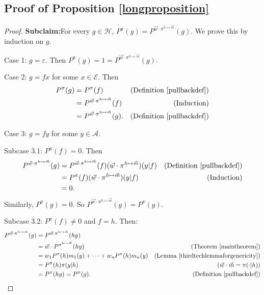 \documentclass[twoside]{article}
\begin{document}
\subsection{Proof of Proposition \ref{longproposition}}
\begin{proof}
    \textbf{Subclaim:}For every $g\in\mathcal H$,
    $P^\pi(g)=P^{\vec w\cdot\pi^{h\mapsto \vec m}}(g)$.
    We prove this by induction on $g$.

    Case 1: $g=\varepsilon$.
    Then $P^\pi(g)=1
    =P^{\vec w\cdot\pi^{h\mapsto \vec m}}(g)$.

    Case 2: $g=fx$ for some $x\in\mathcal E$.
    Then
    \begin{align*}
        P^\pi(g)
            &= P^\pi(f)
                &\mbox{(Definition \ref{pullbackdef})}\\
            &= P^{\vec w\cdot\pi^{h\mapsto \vec m}}(f)
                &\mbox{(Induction)}\\
            &= P^{\vec w\cdot\pi^{h\mapsto \vec m}}(g).
                &\mbox{(Definition \ref{pullbackdef})}
    \end{align*}

    Case 3: $g=fy$ for some $y\in\mathcal A$.

    Subcase 3.1: $P^\pi(f)=0$.
    Then
    \begin{align*}
        P^{\vec w\cdot\pi^{h\mapsto \vec m}}(g)
            &= P^{\vec w\cdot\pi^{h\mapsto \vec m}}(f)
            (\vec w\cdot\pi^{h\mapsto \vec m})(y|f)
                &\mbox{(Definition \ref{pullbackdef})}\\
            &= P^\pi(f)(\vec w\cdot\pi^{h\mapsto \vec m})(y|f)
                &\mbox{(Induction)}\\
            &= 0.
    \end{align*}
    Similarly, $P^\pi(g)=0$. So $P^{\vec w\cdot\pi^{h\mapsto \vec m}}(g)=P^\pi(g)$.

    Subcase 3.2: $P^\pi(f)\not=0$ and $f=h$. Then:
    \begin{align*}
        P^{\vec w\cdot\pi^{h\mapsto \vec m}}(g)
            &= P^{\vec w\cdot\pi^{h\mapsto \vec m}}(hy)\\
            &= \vec w\cdot{P^{\pi^{h\mapsto \vec m}}}(hy)
                    &\mbox{(Theorem \ref{maintheorem})}\\
            &= w_1P^\pi(h)m_1(y)+\cdots+w_nP^\pi(h)m_n(y)
                    &\mbox{(Lemma \ref{thirdtechlemmaforgenericity})}\\
            &= P^\pi(h)\pi(y|h)
                    &\mbox{($\vec w\cdot\vec m=\pi(\cdot|h)$)}\\
            &= P^\pi(hy) = P^\pi(g).
                    &\mbox{(Definition \ref{pullbackdef})}
    \end{align*}


\end{proof}
\end{document}
